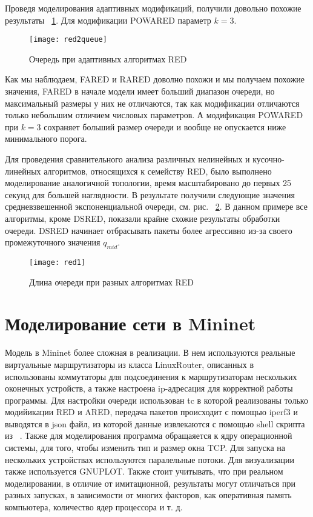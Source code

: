Проведя моделирования адаптивных модификаций, получили довольно похожие результаты ~\ref{ch3:fig4}.
Для модификации POWARED параметр $k=3$. 

\begin{figure}[h!]
  \centering
  \texttt{[image: red2queue]}
  \caption{Очередь при адаптивных алгоритмах RED}
  \label{ch3:fig4}
 \end{figure}

Как мы наблюдаем, FARED и RARED доволно похожи и мы получаем
похожие значения, FARED в начале модели имеет больший диапазон
очереди, но максимальный размеры у них не отличаются, так как 
модификации отличаются только небольшим отличием числовых параметров.
А модификация POWARED при $k=3$ сохраняет больший размер очереди и вообще не опускается
ниже минимального порога. 

Для проведения сравнительного анализа различных нелинейных 
и кусочно-линейных алгоритмов, относящихся к семейству RED, 
было выполнено моделирование аналогичной топологии, время 
масштабировано до первых 25 секунд для большей наглядности. 
В результате получили следующие значения средневзвешенной экспоненциальной
очереди, см. рис. ~\ref{ch3:fig5}. В данном примере все алгоритмы, кроме DSRED, 
показали крайне схожие результаты обработки очереди. DSRED начинает 
отбрасывать пакеты более агрессивно из-за своего промежуточного значения $q_{mid}$.

\begin{figure}[h!]
  \centering
  \texttt{[image: red1]}
  \caption{Длина очереди при разных алгоритмах RED}
  \label{ch3:fig5}
\end{figure}

\section{Моделирование сети в Mininet}
\label{chap3:sec2}

Модель в Mininet более сложная в реализации. В нем используются реальные виртуальные маршрутизаторы 
из класса LinuxRouter, описанных в ~\cite{mininet-repo} использованы коммутаторы для подсоединения к маршрутизаторам нескольких оконечных 
устройств, а также настроена ip-адресация для корректной работы программы. Для настройки очереди использован 
tc в которой реализованы только модийикации RED и ARED, передача пакетов происходит с помощью iperf3 и 
выводятся в json файл, из которой данные извлекаются с помощью shell скрипта из ~\cite{iperf3-plotter}. 
Также для моделирования программа обращаяется к ядру операционной системы, для того, чтобы изменить тип и размер
окна TCP. Для запуска на нескольких устройствах используются паралельные потоки. Для визуализации также используется GNUPLOT.
Также стоит учитывать, что при реальном моделировании, в отличие от имитационной, результаты могут отличаться при разных запусках,
в зависимости от многих факторов, как оперативная память компьютера, количество ядер процессора и т. д.  

